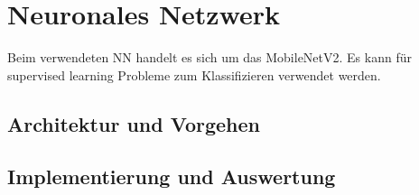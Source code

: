 \documentclass[12pt,toc=bib,toc=listof]{scrreprt}
\begin{document}
\chapter{Neuronales Netzwerk} %
\label{sec:nn}
Beim verwendeten NN handelt es sich um das MobileNetV2. Es kann für supervised learning Probleme zum Klassifizieren verwendet werden.

\section{Architektur und Vorgehen}
\label{sec_nn:architecture}


\section{Implementierung und Auswertung}
\label{sec_nn:impl}
\end{document}
